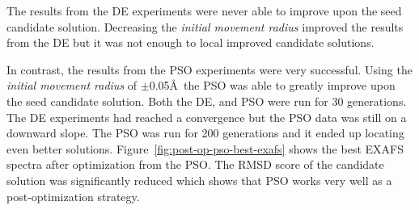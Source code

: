 The results from the DE experiments were never able to improve upon the seed candidate solution. Decreasing the \textit{initial movement radius} improved the results from the DE but it was not enough to local improved candidate solutions.

In contrast, the results from the PSO experiments were very successful. Using the \textit{initial movement radius} of $\pm$0.05\AA\ the PSO was able to greatly improve upon the seed candidate solution. Both the DE, and PSO were run for 30 generations. The DE experiments had reached a convergence but the PSO data was still on a downward slope. The PSO was run for 200 generations and it ended up locating even better solutions. Figure~\ref{fig:post-op-pso-best-exafs} shows the best EXAFS spectra after optimization from the PSO. The RMSD score of the candidate solution was significantly reduced which shows that PSO works very well as a post-optimization strategy. 

\begin{figure*}
	\centering
	\caption{OEC EXAFS Spectra Comparison}
	\label{fig:post-op-pso-best-exafs}
\end{figure*}